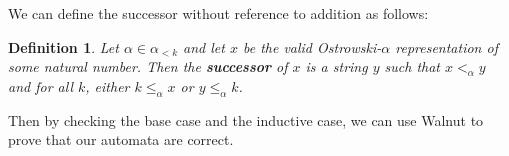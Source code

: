 \documentclass[landscape]{sciposter}
\newtheorem*{definition}{Definition}
\begin{document}
\begin{multicols}{3}
We can define the successor without reference to addition as follows:

\begin{definition}
Let $\alpha \in \alpha_{<k}$ and let $x$ be the valid Ostrowski-$\alpha$ representation of some natural number.
Then the \textbf{successor} of $x$ is a string $y$ such that $x <_{\alpha} y$ and for all $k$, either $k \leq_{\alpha} x$ or $y \leq_{\alpha} k$.
\end{definition}

Then by checking the base case and the inductive case, we can use Walnut to prove that our automata are correct.


\end{multicols}
\end{document}
